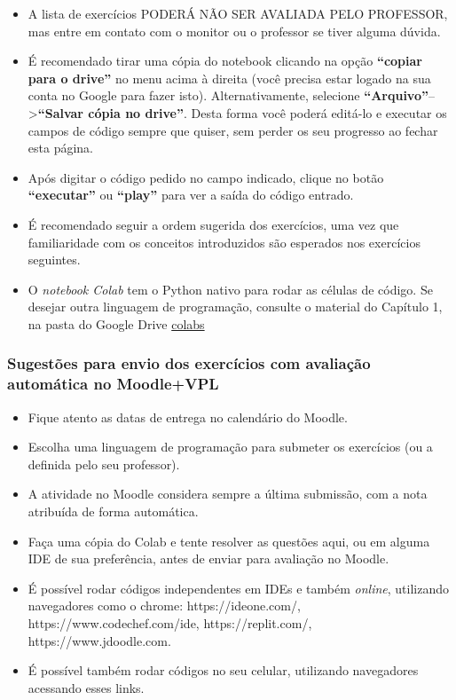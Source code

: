 \documentclass[12pt,a4paper]{article}
\providecommand{\tightlist}{%
      \setlength{\itemsep}{0pt}\setlength{\parskip}{0pt}}
\begin{document}
    \begin{itemize}
\tightlist
\item
  A lista de exercícios PODERÁ NÃO SER AVALIADA PELO PROFESSOR, mas
  entre em contato com o monitor ou o professor se tiver alguma dúvida.
\item
  É recomendado tirar uma cópia do notebook clicando na opção
  \textbf{``copiar para o drive''} no menu acima à direita (você precisa
  estar logado na sua conta no Google para fazer isto).
  Alternativamente, selecione
  \textbf{``Arquivo''}--\textgreater{}\textbf{``Salvar cópia no
  drive''}. Desta forma você poderá editá-lo e executar os campos de
  código sempre que quiser, sem perder os seu progresso ao fechar esta
  página.
\item
  Após digitar o código pedido no campo indicado, clique no botão
  \textbf{``executar''} ou \textbf{``play''} para ver a saída do código
  entrado.
\item
  É recomendado seguir a ordem sugerida dos exercícios, uma vez que
  familiaridade com os conceitos introduzidos são esperados nos
  exercícios seguintes.
\item
  O \emph{notebook Colab} tem o Python nativo para rodar as células de
  código. Se desejar outra linguagem de programação, consulte o material
  do Capítulo 1, na pasta do Google Drive
  \href{https://drive.google.com/drive/folders/1YlFwv8XYN7PYYf-HwDMlkxzbmXzJw9cM?usp=sharing}{colabs}
\end{itemize}

    \hypertarget{sugestuxf5es-para-envio-dos-exercuxedcios-com-avaliauxe7uxe3o-automuxe1tica-no-moodlevpl}{%
\subsubsection{Sugestões para envio dos exercícios com avaliação
automática no
Moodle+VPL}\label{sugestuxf5es-para-envio-dos-exercuxedcios-com-avaliauxe7uxe3o-automuxe1tica-no-moodlevpl}}

    \begin{itemize}
\tightlist
\item
  Fique atento as datas de entrega no calendário do Moodle.
\item
  Escolha uma linguagem de programação para submeter os exercícios (ou a
  definida pelo seu professor).
\item
  A atividade no Moodle considera sempre a última submissão, com a nota
  atribuída de forma automática.
\item
  Faça uma cópia do Colab e tente resolver as questões aqui, ou em
  alguma IDE de sua preferência, antes de enviar para avaliação no
  Moodle.
\item
  É possível rodar códigos independentes em IDEs e também \emph{online},
  utilizando navegadores como o chrome: https://ideone.com/,
  https://www.codechef.com/ide, https://replit.com/,
  https://www.jdoodle.com.
\item
  É possível também rodar códigos no seu celular, utilizando navegadores
  acessando esses links.
\end{itemize}
\end{document}
